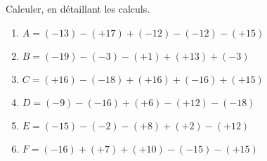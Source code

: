\documentclass[8pt]{extarticle}
\begin{document}


\begin{exercice}[1]
Calculer, en détaillant les calculs.
\begin{multicols}{3}
\begin{enumerate}[label={}]
	\item  $ A =  (-13)-(+17)+(-12)-(-12)-(+15)$
	\item  $ B =  (-19)-(-3)-(+1)+(+13)+(-3)$
	\item  $ C =  (+16)-(-18)+(+16)+(-16)+(+15)$
	\item  $ D =  (-9)-(-16)+(+6)-(+12)-(-18)$
	\item  $ E =  (-15)-(-2)-(+8)+(+2)-(+12)$
	\item  $ F =  (-16)+(+7)+(+10)-(-15)-(+15)$
\end{enumerate}
\end{multicols}
\end{exercice}


\end{document}
